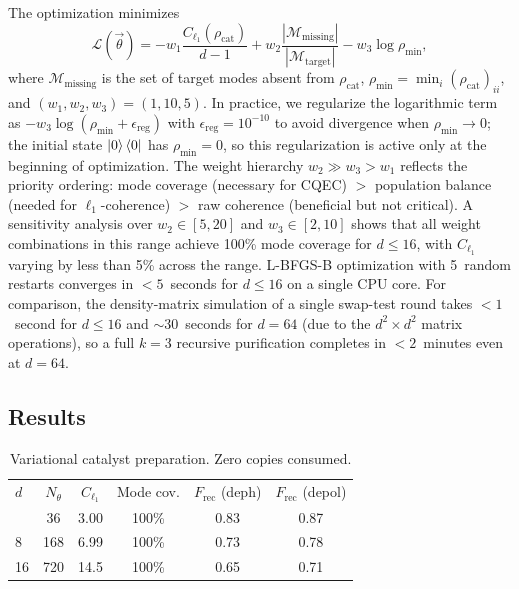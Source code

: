 \documentclass[prx,twocolumn,superscriptaddress,longbibliography,floatfix]{revtex4-2}
\begin{document}
The optimization minimizes
\begin{equation}
\mathcal{L}(\vec\theta) = -w_1 \frac{C_{\ell_1}(\rho_\mathrm{cat})}{d-1} + w_2 \frac{|\mathcal{M}_\mathrm{missing}|}{|\mathcal{M}_\mathrm{target}|} - w_3 \log \rho_\mathrm{min},
\label{eq:var_cost}
\end{equation}
where $\mathcal{M}_\mathrm{missing}$ is the set of target modes absent from $\rho_\mathrm{cat}$, $\rho_\mathrm{min} = \min_i (\rho_\mathrm{cat})_{ii}$, and $(w_1, w_2, w_3) = (1, 10, 5)$.
In practice, we regularize the logarithmic term as $-w_3 \log(\rho_\mathrm{min} + \epsilon_\mathrm{reg})$ with $\epsilon_\mathrm{reg} = 10^{-10}$ to avoid divergence when $\rho_\mathrm{min} \to 0$; the initial state $\ket{0}\bra{0}$ has $\rho_\mathrm{min} = 0$, so this regularization is active only at the beginning of optimization.
The weight hierarchy $w_2 \gg w_3 > w_1$ reflects the priority ordering: mode coverage (necessary for CQEC) $>$ population balance (needed for $\ell_1$-coherence) $>$ raw coherence (beneficial but not critical).
A sensitivity analysis over $w_2 \in [5, 20]$ and $w_3 \in [2, 10]$ shows that all weight combinations in this range achieve 100\% mode coverage for $d \leq 16$, with $C_{\ell_1}$ varying by less than 5\% across the range.
L-BFGS-B optimization with 5~random restarts converges in $<5$~seconds for $d \leq 16$ on a single CPU core.
For comparison, the density-matrix simulation of a single swap-test round takes $<1$~second for $d \leq 16$ and $\sim\!30$~seconds for $d = 64$ (due to the $d^2 \times d^2$ matrix operations), so a full $k = 3$ recursive purification completes in $<2$~minutes even at $d = 64$.

\subsection{Results}
\label{sec:var_results}

\begin{table}[tb]
\caption{Variational catalyst preparation. Zero copies consumed.}
\label{tab:variational}
\begin{ruledtabular}
\begin{tabular}{lccccc}
$d$ & $N_\theta$ & $C_{\ell_1}$ & Mode cov. & $F_\mathrm{rec}$ (deph) & $F_\mathrm{rec}$ (depol) \\
\colrule
4 & 36 & 3.00 & 100\% & 0.83 & 0.87 \\
8 & 168 & 6.99 & 100\% & 0.73 & 0.78 \\
16 & 720 & 14.5 & 100\% & 0.65 & 0.71 \\
\end{tabular}
\end{ruledtabular}
\end{table}
\end{document}
